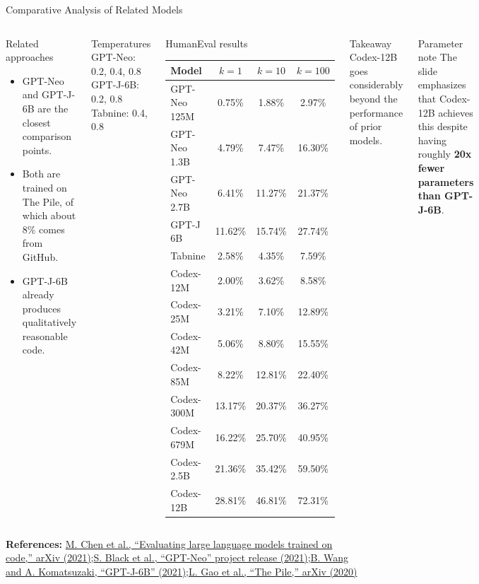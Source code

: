 \documentclass[aspectratio=43,9pt]{beamer}
\newcommand{\srclink}[2]{\href{#2}{\textcolor{black!68}{#1}}}
\newcommand{\sep}{;\hspace{0.35em}}
\newcommand{\refline}[2][References]{%
  \vfill
  {\raggedright\fontsize{5.1}{5.5}\selectfont\color{black!68}\textbf{#1:} #2\par}%
}
\newcommand{\srcChen}{\srclink{M. Chen et al., ``Evaluating large language models trained on code,'' arXiv (2021)}{https://arxiv.org/abs/2107.03374}}
\newcommand{\srcGao}{\srclink{L. Gao et al., ``The Pile,'' arXiv (2020)}{https://arxiv.org/abs/2101.00027}}
\newcommand{\srcWang}{\srclink{B. Wang and A. Komatsuzaki, ``GPT-J-6B'' (2021)}{https://arankomatsuzaki.wordpress.com/2021/06/04/gpt-j/}}
\newcommand{\srcBlack}{\srclink{S. Black et al., ``GPT-Neo'' project release (2021)}{https://zenodo.org/records/5297715}}
\begin{document}
\begin{frame}{Comparative Analysis of Related Models}
\tiny
\begin{columns}[T,totalwidth=\textwidth]
\begin{block}{Related approaches}
\begin{itemize}
  \item GPT-Neo and GPT-J-6B are the closest comparison points.
  \item Both are trained on The Pile, of which about 8\% comes from GitHub.
  \item GPT-J-6B already produces qualitatively reasonable code.
\end{itemize}
\end{block}

\begin{block}{Temperatures}
GPT-Neo: 0.2, 0.4, 0.8\\
GPT-J-6B: 0.2, 0.8\\
Tabnine: 0.4, 0.8
\end{block}

\begin{block}{HumanEval results}
\begin{tabular}{lccc}
\toprule
Model & \(k=1\) & \(k=10\) & \(k=100\)\\
\midrule
GPT-Neo 125M & 0.75\% & 1.88\% & 2.97\%\\
GPT-Neo 1.3B & 4.79\% & 7.47\% & 16.30\%\\
GPT-Neo 2.7B & 6.41\% & 11.27\% & 21.37\%\\
GPT-J 6B & 11.62\% & 15.74\% & 27.74\%\\
Tabnine & 2.58\% & 4.35\% & 7.59\%\\
\midrule
Codex-12M & 2.00\% & 3.62\% & 8.58\%\\
Codex-25M & 3.21\% & 7.10\% & 12.89\%\\
Codex-42M & 5.06\% & 8.80\% & 15.55\%\\
Codex-85M & 8.22\% & 12.81\% & 22.40\%\\
Codex-300M & 13.17\% & 20.37\% & 36.27\%\\
Codex-679M & 16.22\% & 25.70\% & 40.95\%\\
Codex-2.5B & 21.36\% & 35.42\% & 59.50\%\\
Codex-12B & 28.81\% & 46.81\% & 72.31\%\\
\bottomrule
\end{tabular}
\end{block}

\begin{alertblock}{Takeaway}
Codex-12B goes considerably beyond the performance of prior models.
\end{alertblock}

\begin{exampleblock}{Parameter note}
The slide emphasizes that Codex-12B achieves this despite having roughly \textbf{20x fewer parameters than GPT-J-6B}. 
\end{exampleblock}
\end{columns}

\refline{\srcChen\sep \srcBlack\sep \srcWang\sep \srcGao}
\end{frame}
\end{document}
